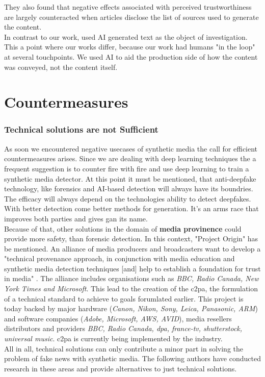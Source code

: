 \documentclass[
  a4paper,  %
  twoside,  %
  bibliography=totoc,
  headsepline,
  cleardoublepage=empty,
  parskip=half,
  draft=false
]{scrbook}
\begin{document}
They also found that negative effects associated with perceived trustworthiness are largely counteracted when articles disclose the list of sources used to generate the content. \\
In contrast to our work, \citeauthor{toffTheyCouldJust2023} used AI generated text as the object of investigation. This a point where our works differ, because our work had humans "in the loop" at several touchpoints. We used AI to aid the production side of how the content was conveyed, not the content itself. 


\section{Countermeasures}
\label{sec:rel-work-counteringdf}
\subsubsection*{Technical solutions are not Sufficient}
As soon we encountered negative usecases of synthetic media the call for efficient countermeasures arises. Since we are dealing with deep learning techniques the a frequent suggestion is to counter fire with fire and use deep learning to train a synthetic media detector. At this point it must be mentioned, that anti-deepfake technology, like forensics and AI-based detection will always have its boundries. The efficacy will always depend on the technologies ability to detect deepfakes. With better detection come better methods for generation. It's an arms race that improves both parties and gives \gls{gan} its name. \\
Because of that, other solutions in the domain of \textbf{media provinence} could provide more safety, than forensic detection. In this context, "Project Origin" has be mentioned. An alliance of media producers and broadcasters want to develop a "technical provenance approach, in conjunction with media education and synthetic media detection techniques [and] help to establish a foundation for trust in media" \cite{ProjectOrigin}. The alliance includes organisations such as \textit{BBC, Radio Canada, New York Times and Microsoft}. This lead to the creation of the \gls{c2pa}, the formulation of a technical standard to achieve to goals forumlated earlier. This project is today backed by major hardware (\textit{Canon, Nikon, Sony, Leica, Panasonic, ARM}) and software companies (\textit{Adobe, Microsoft, AWS, AVID}), media resellers distributors and providers \textit{BBC, Radio Canada, dpa, france-tv, shutterstock, universal music}. \gls{c2pa} is currently being implemented by the industry. \\
All in all, technical solutions can only contribute a minor part in solving the problem of fake news with synthetic media. The following authors have conducted research in these areas and provide alternatives to just technical solutions. 
\end{document}
